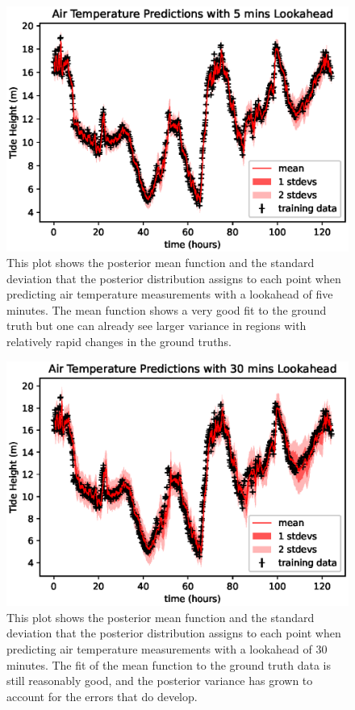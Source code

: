 \documentclass{article}
\begin{document}
                \begin{figure}[h!]
                    \includegraphics[width=\linewidth,height=\textheight,keepaspectratio]{air_temp_lookahead_5mins.eps}
                    \caption{This plot shows the posterior mean function and the standard deviation that the posterior distribution assigns to each point when predicting air temperature measurements with a lookahead of five minutes. The mean function shows a very good fit to the ground truth but one can already see larger variance in regions with relatively rapid changes in the ground truths.}
                    \label{plot_airtemplookahead_5mins}
                \end{figure}

                \begin{figure}[h!]
                    \includegraphics[width=\linewidth,height=\textheight,keepaspectratio]{air_temp_lookahead_30mins.eps}
                    \caption{This plot shows the posterior mean function and the standard deviation that the posterior distribution assigns to each point when predicting air temperature measurements with a lookahead of 30 minutes. The fit of the mean function to the ground truth data is still reasonably good, and the posterior variance has grown to account for the errors that do develop.}
                    \label{plot_airtemplookahead_30mins}
                \end{figure}
\end{document}
